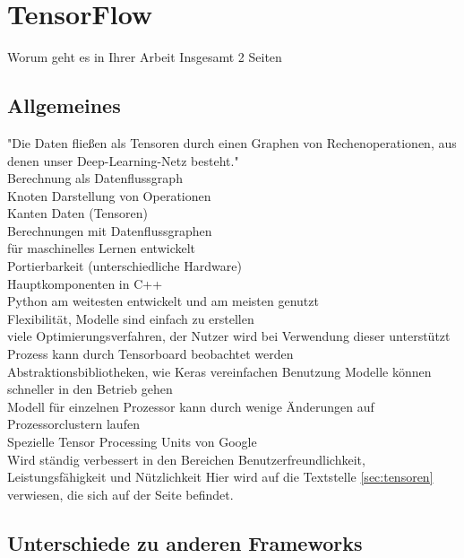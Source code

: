 \chapter{TensorFlow}
\label{chap:tensorflow}
\chapterauthor{\authorNiklas}

Worum geht es in Ihrer Arbeit \citep{Einfuehrung}
Insgesamt 2 Seiten

\section{Allgemeines}
\label{sec:allgemeines}
"Die Daten fließen als Tensoren durch einen Graphen von Rechenoperationen, aus denen unser Deep-Learning-Netz besteht." \cite{Einfuehrung}\\
Berechnung als Datenflussgraph\\
Knoten Darstellung von Operationen\\
Kanten Daten (Tensoren)\\
Berechnungen mit Datenflussgraphen\\
für maschinelles Lernen entwickelt\\
Portierbarkeit (unterschiedliche Hardware)\\
Hauptkomponenten in C++\\
Python am weitesten entwickelt und am meisten genutzt\\
Flexibilität, Modelle sind einfach zu erstellen\\
viele Optimierungsverfahren, der Nutzer wird bei Verwendung dieser unterstützt\\
Prozess kann durch Tensorboard beobachtet werden\\
Abstraktionsbibliotheken, wie Keras vereinfachen Benutzung
Modelle können schneller in den Betrieb gehen\\
Modell für einzelnen Prozessor kann durch wenige Änderungen
auf Prozessorclustern laufen\\
Spezielle Tensor Processing Units von Google\\
Wird ständig verbessert in den Bereichen Benutzerfreundlichkeit, Leistungsfähigkeit und Nützlichkeit
Hier wird auf die Textstelle \ref{sec:tensoren} verwiesen, die
sich auf der Seite \pageref{sec:tensoren} befindet.

\section{Unterschiede zu anderen Frameworks}
\label{sec:unterschiede}
